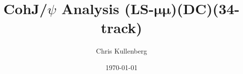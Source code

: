 \title{CohJ/$\psi$ Analysis (\textbf{LS}-$\boldsymbol{\mu\mu}$)(\textbf{DC})(\textbf{34-track})}
\author{Chris Kullenberg}
\date{\today}
